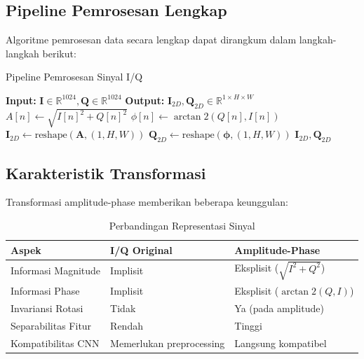 \documentclass{article}
\begin{document}
\subsection{Pipeline Pemrosesan Lengkap}
Algoritme pemrosesan data secara lengkap dapat dirangkum dalam langkah-langkah berikut:

\begin{algorithm}[h]
\caption{Pipeline Pemrosesan Sinyal I/Q}
\label{alg:data_processing}
\begin{algorithmic}[1]
\STATE \textbf{Input:} $\mathbf{I} \in \mathbb{R}^{1024}, \mathbf{Q} \in \mathbb{R}^{1024}$
\STATE \textbf{Output:} $\mathbf{I}_{2D}, \mathbf{Q}_{2D} \in \mathbb{R}^{1 \times H \times W}$
\STATE 
{}
    \STATE $A[n] \leftarrow \sqrt{I[n]^2 + Q[n]^2}$ 
    \STATE $\phi[n] \leftarrow \arctan2(Q[n], I[n])$ 
\ENDFOR
\STATE 
\STATE $\mathbf{I}_{2D} \leftarrow \text{reshape}(\mathbf{A}, (1, H, W))$ 
\STATE $\mathbf{Q}_{2D} \leftarrow \text{reshape}(\boldsymbol{\phi}, (1, H, W))$ 
\STATE 
\RETURN $\mathbf{I}_{2D}, \mathbf{Q}_{2D}$
\end{algorithmic}
\end{algorithm}


\subsection{Karakteristik Transformasi}
Transformasi amplitude-phase memberikan beberapa keunggulan:

\begin{table}[h]
\centering
\caption{Perbandingan Representasi Sinyal}
\label{tab:signal_representation}
\begin{tabular}{|l|l|l|}
\hline
\textbf{Aspek} & \textbf{I/Q Original} & \textbf{Amplitude-Phase} \\
\hline
Informasi Magnitude & Implisit & Eksplisit ($\sqrt{I^2 + Q^2}$) \\
Informasi Phase & Implisit & Eksplisit ($\arctan2(Q,I)$) \\
Invariansi Rotasi & Tidak & Ya (pada amplitude) \\
Separabilitas Fitur & Rendah & Tinggi \\
Kompatibilitas CNN & Memerlukan preprocessing & Langsung kompatibel \\
\hline
\end{tabular}
\end{table}
\end{document}

